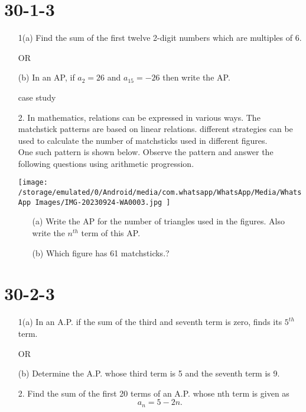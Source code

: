 \documentclass{article}
\begin{document}
\section{30-1-3}
\begin{enumerate}
   
   
    \item[1(a)] Find the sum of the first twelve 2-digit numbers which are multiples of 6.  
    \begin{center}
    OR
\end{center}
    \item[(b)] In an AP, if $a_2 = 26$ and $a_{15} = -26$ then write the AP.
 \begin{center}
 
    case study
\end{center}
\item[2.] In mathematics, relations can be expressed in various ways. The matchstick patterns are based on linear relations. different strategies can be used to calculate the number of matchsticks used in different figures.\\
 
  One such pattern is shown below. Observe the pattern and answer the following questions using arithmetic progression.

  \texttt{[image:  /storage/emulated/0/Android/media/com.whatsapp/WhatsApp/Media/WhatsApp Images/IMG-20230924-WA0003.jpg  ]}
   

\begin{enumerate}

\item[(a)]Write the AP for the number of triangles used in the figures. Also
write the $n^{th}$ term of this AP.
\item[(b)] Which figure has 61 matchsticks.?
\end{enumerate}
\end{enumerate}


\section{30-2-3}
\begin{enumerate}
    \item[1(a)] In an A.P. if the sum of the third and seventh term is zero, finds its $5^{th}$
    term.
    \begin{center}
    OR
\end{center}
\item[(b)] Determine the A.P. whose third term is 5 and the seventh term is 9.
\item [2.]Find the sum of the first 20 terms of an A.P. whose nth term is given as \[a_n= 5 - 2n.\]
\end{enumerate}
\end{document}
